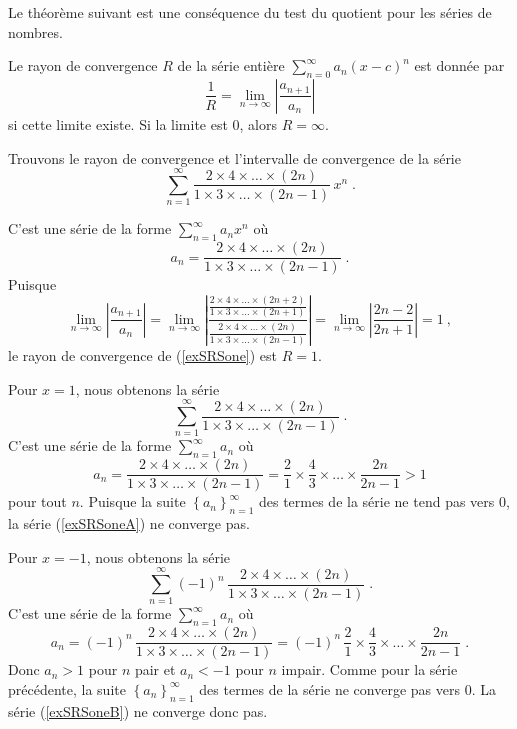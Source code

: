 {Le théorème suivant est une conséquence du test du quotient pour les séries
de nombres.

\begin{theorem} \label{RadiusConvComp}
Le rayon de convergence $R$ de la série entière
$\displaystyle \sum_{n=0}^\infty a_n (x-c)^n$ est donnée par
\[
\frac{1}{R} = \lim_{n\rightarrow \infty} \left|\frac{a_{n+1}}{a_n}\right|
\]
si cette limite existe.  Si la limite est $0$, alors $R=\infty$.
\end{theorem}

\begin{egg}
Trouvons le rayon de convergence et l'intervalle de convergence de la série
\begin{equation}\label{exSRSone}
\sum_{n=1}^\infty \frac{2\times 4 \times \ldots \times (2n)}
{1 \times 3 \times \ldots \times (2n-1)} \, x^n \; .
\end{equation}

C'est une série de la forme $\displaystyle \sum_{n=1}^\infty a_n x^n$ où
\[
a_n = \frac{2 \times 4 \times \ldots \times (2n)}
{1 \times 3 \times \ldots \times (2n-1)} \; .
\]
Puisque
\[
\lim_{n\rightarrow \infty} \left| \frac{a_{n+1}}{a_n}\right|
= \lim_{n\rightarrow \infty} \left|
\frac{\displaystyle \frac{2 \times 4 \times \ldots \times (2n+2)}
{\displaystyle 1 \times 3 \times \ldots \times (2n+1)}}
{\displaystyle \frac{2 \times 4 \times \ldots \times (2n)}
{\displaystyle 1 \times 3 \times \ldots \times (2n-1)}} \right|
= \lim_{n\rightarrow \infty} \left| \frac{2n-2}{2n+1} \right| = 1 \ ,
\]
le rayon de convergence de (\ref{exSRSone}) est $R=1$.

Pour $x=1$, nous obtenons la série
\begin{equation}\label{exSRSoneA}
\sum_{n=1}^\infty \frac{2\times 4 \times \ldots \times (2n)}
{1 \times 3 \times \ldots \times (2n-1)} \; .
\end{equation}
C'est une série de la forme $\displaystyle \sum_{n=1}^\infty a_n$ où
\[
a_n = \frac{2\times 4 \times \ldots \times (2n)}
{1 \times 3 \times \ldots \times (2n-1)}
 = \frac{2}{1}\times \frac{4}{3} \times \ldots \times \frac{2n}{2n-1}
>1
\]
pour tout $n$.  Puisque la suite
$\displaystyle \left\{ a_n \right\}_{n=1}^\infty$ des termes de la
série ne tend pas vers $0$, la série (\ref{exSRSoneA}) ne converge
pas.

Pour $x=-1$, nous obtenons la série
\begin{equation}\label{exSRSoneB}
\sum_{n=1}^\infty (-1)^n \,\frac{2\times 4 \times \ldots \times (2n)}
{1 \times 3 \times \ldots \times (2n-1)} \; .
\end{equation}
C'est une série de la forme
$\displaystyle \sum_{n=1}^\infty a_n$ où
\[
a_n = (-1)^n \, \frac{2\times 4 \times \ldots \times (2n)}
{1 \times 3 \times \ldots \times (2n-1)}
 = (-1)^n \,\frac{2}{1}\times \frac{4}{3} \times \ldots \times
\frac{2n}{2n-1} \; .
\]
Donc $a_n > 1$ pour $n$ pair et $a_n<-1$ pour $n$ impair.  Comme pour la
série précédente, la suite
$\displaystyle \left\{ a_n \right\}_{n=1}^\infty$ des termes de la
série ne converge pas vers $0$.  La série (\ref{exSRSoneB}) ne
converge donc pas.


\end{egg}}
